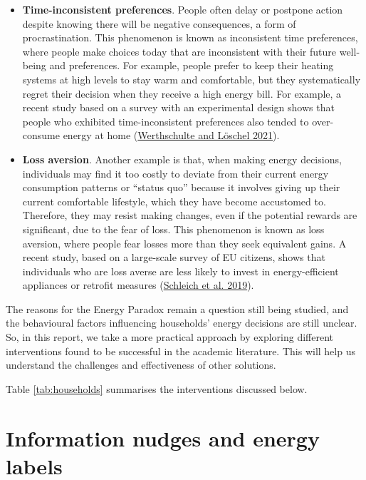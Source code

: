 \documentclass[
  11pt,
  captions=heading]{scrreport}
\begin{document}
\begin{itemize}
\item
  \textbf{Time-inconsistent preferences}. People often delay or postpone
  action despite knowing there will be negative consequences, a form of
  procrastination. This phenomenon is known as inconsistent time
  preferences, where people make choices today that are inconsistent
  with their future well-being and preferences. For example, people
  prefer to keep their heating systems at high levels to stay warm and
  comfortable, but they systematically regret their decision when they
  receive a high energy bill. For example, a recent study based on a
  survey with an experimental design shows that people who exhibited
  time-inconsistent preferences also tended to over-consume energy at
  home (\protect\hyperlink{ref-werthschulte2021role}{Werthschulte and
  Löschel 2021}).
\item
  \textbf{Loss aversion}. Another example is that, when making energy
  decisions, individuals may find it too costly to deviate from their
  current energy consumption patterns or ``status quo'' because it
  involves giving up their current comfortable lifestyle, which they
  have become accustomed to. Therefore, they may resist making changes,
  even if the potential rewards are significant, due to the fear of
  loss. This phenomenon is known as loss aversion, where people fear
  losses more than they seek equivalent gains. A recent study, based on
  a large-scale survey of EU citizens, shows that individuals who are
  loss averse are less likely to invest in energy-efficient appliances
  or retrofit measures
  (\protect\hyperlink{ref-schleich2019large}{Schleich et al. 2019}).
\end{itemize}

The reasons for the Energy Paradox remain a question still being
studied, and the behavioural factors influencing households' energy
decisions are still unclear. So, in this report, we take a more
practical approach by exploring different interventions found to be
successful in the academic literature. This will help us understand the
challenges and effectiveness of other solutions.

Table \ref{tab:households} summarises the interventions discussed below.

\hypertarget{information-nudges-and-energy-labels}{%
\section{Information nudges and energy
labels}\label{information-nudges-and-energy-labels}}
\end{document}
